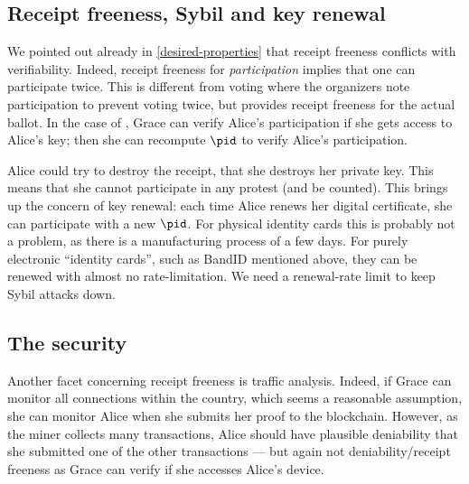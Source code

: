 






 
\subsection{Receipt freeness, Sybil and key renewal}

We pointed out already in \cref{desired-properties} that receipt freeness 
conflicts with verifiability.
Indeed, receipt freeness for \emph{participation} implies that one can 
participate twice.
This is different from voting where the organizers note participation to 
prevent voting twice, but provides receipt freeness for the actual ballot.
In the case of \CROCUS, Grace can verify Alice's participation if she gets 
access to Alice's key; then she can recompute \(\pid\) to verify Alice's 
participation.

Alice could try to destroy the receipt, \ie that she destroys her private key.
This means that she cannot participate in any protest (and be counted).
This brings up the concern of key renewal: each time Alice renews her digital 
certificate, she can participate with a new \(\pid\).
For physical identity cards this is probably not a problem, as there is a 
manufacturing process of a few days.
For purely electronic \enquote{identity cards}, such as BandID mentioned above, 
they can be renewed with almost no rate-limitation.
We need a renewal-rate limit to keep Sybil attacks down.

\subsection{The security}

Another facet concerning receipt freeness is traffic analysis. Indeed, if Grace 
can monitor all connections within the country, which seems a reasonable 
assumption, she can monitor Alice when she submits her proof to the blockchain. 
However, as the miner collects many transactions, Alice should have plausible 
deniability that she submitted one of the other transactions --- but again not 
deniability/receipt freeness as Grace can verify if she accesses Alice's 
device.


